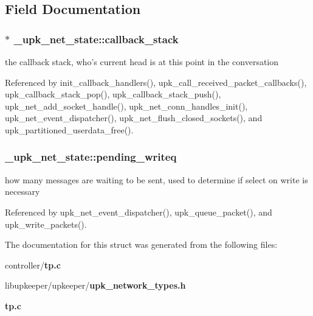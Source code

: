 \subsection{Field Documentation}
\subsubsection[{callback\_\-stack}]{ $\ast$ {\bf \_\-upk\_\-net\_\-state::callback\_\-stack}}\label{struct__upk__net__state_ac33759fbf7a7b4cf6efbbe9ee169e590}
the callback stack, who's current head is at this point in the conversation 

Referenced by init\_\-callback\_\-handlers(), upk\_\-call\_\-received\_\-packet\_\-callbacks(), upk\_\-callback\_\-stack\_\-pop(), upk\_\-callback\_\-stack\_\-push(), upk\_\-net\_\-add\_\-socket\_\-handle(), upk\_\-net\_\-conn\_\-handles\_\-init(), upk\_\-net\_\-event\_\-dispatcher(), upk\_\-net\_\-flush\_\-closed\_\-sockets(), and upk\_\-partitioned\_\-userdata\_\-free().

\subsubsection[{pending\_\-writeq}]{ {\bf \_\-upk\_\-net\_\-state::pending\_\-writeq}}\label{struct__upk__net__state_a99cc33993d971dcd86f14f9dcf1736d2}
how many messages are waiting to be sent, used to determine if select on write is necessary 

Referenced by upk\_\-net\_\-event\_\-dispatcher(), upk\_\-queue\_\-packet(), and upk\_\-write\_\-packets().



The documentation for this struct was generated from the following files:\begin{DoxyCompactItemize}
\item 
controller/{\bf tp.c}\item 
libupkeeper/upkeeper/{\bf upk\_\-network\_\-types.h}\item 
{\bf tp.c}\end{DoxyCompactItemize}
